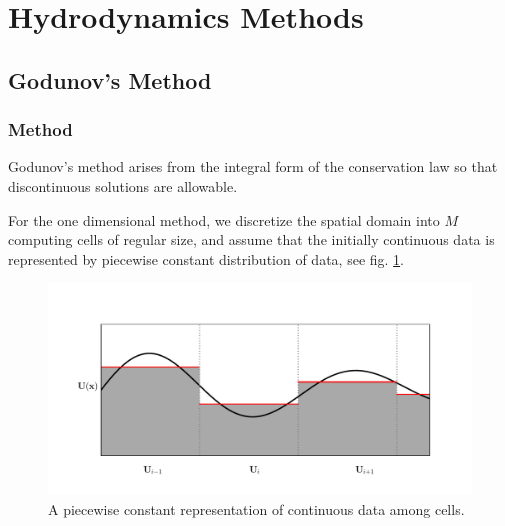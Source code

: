 \newpage

\section{Hydrodynamics Methods}\label{chap:hydro}


\subsection{Godunov's Method}










\subsubsection{Method}

Godunov's method arises from the integral form of the conservation law so that discontinuous solutions are allowable.

For the one dimensional method, we discretize the spatial domain into $M$ computing cells of regular size, and assume that the initially continuous data is represented by piecewise constant distribution of data, see fig. \ref{fig:piecewise-constant}.



\begin{figure}[H]
	\includegraphics[width=\textwidth]{./figures/piecewise_const.pdf}%
	\caption{	
		A piecewise constant representation of continuous data among cells.
		\label{fig:piecewise-constant}
		}
\end{figure}

